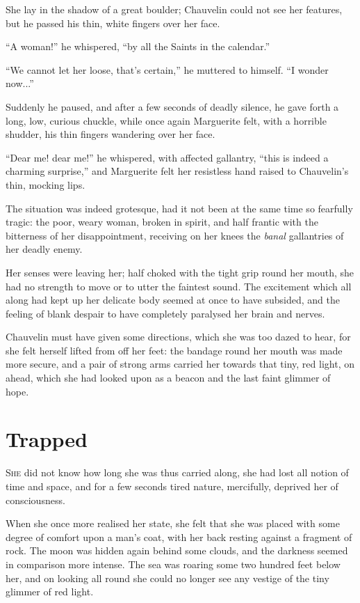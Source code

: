 \documentclass[paper=a5,BCOR=7mm,twoside,DIV=calc,12pt,usegeometry,chapterprefix,endperiod,headings=big]{scrbook}
\begin{document}
She lay in the shadow of a great boulder; Chauvelin could not see her features, but he passed his thin, white fingers over her face.

\enquote{A woman!} he whispered, \enquote{by all the Saints in the calendar.}

\enquote{We cannot let her loose, that's certain,} he muttered to himself. \enquote{I wonder now...}

Suddenly he paused, and after a few seconds of deadly silence, he gave forth a long, low, curious chuckle, while once again Marguerite felt, with a horrible shudder, his thin fingers wandering over her face.

\enquote{Dear me! dear me!} he whispered, with affected gallantry, \enquote{this is indeed a charming surprise,} and Marguerite felt her resistless hand raised to Chauvelin's thin, mocking lips.

The situation was indeed grotesque, had it not been at the same time so fearfully tragic: the poor, weary woman, broken in spirit, and half frantic with the bitterness of her disappointment, receiving on her knees the \textit{banal} gallantries of her deadly enemy.

Her senses were leaving her; half choked with the tight grip round her mouth, she had no strength to move or to utter the faintest sound. The excitement which all along had kept up her delicate body seemed at once to have subsided, and the feeling of blank despair to have completely paralysed her brain and nerves.

Chauvelin must have given some directions, which she was too dazed to hear, for she felt herself lifted from off her feet: the bandage round her mouth was made more secure, and a pair of strong arms carried her towards that tiny, red light, on ahead, which she had looked upon as a beacon and the last faint glimmer of hope.

\chapter{Trapped}
\lettrine[lines=4]{S}{he} did not know how long she was thus carried along, she had lost all notion of time and space, and for a few seconds tired nature, mercifully, deprived her of consciousness.

When she once more realised her state, she felt that she was placed with some degree of comfort upon a man's coat, with her back resting against a fragment of rock. The moon was hidden again behind some clouds, and the darkness seemed in comparison more intense. The sea was roaring some two hundred feet below her, and on looking all round she could no longer see any vestige of the tiny glimmer of red light.
\end{document}
